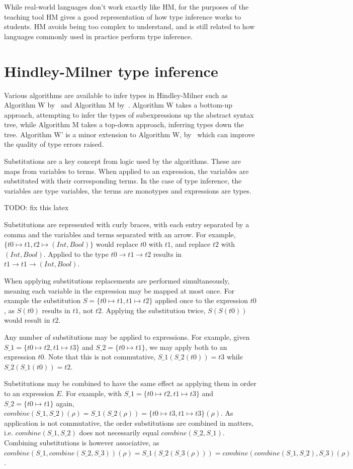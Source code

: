 \documentclass[a4paper,fleqn,twoside,12pt]{report}
\begin{document}
While real-world languages don’t work exactly like HM, for the purposes of the teaching tool HM gives a good representation of how type inference works to students. HM avoids being too complex to understand, and is still related to how languages commonly used in practice perform type inference.
\section{Hindley-Milner type inference}\label{id:h.admfqf7bhkct}
Various algorithms are available to infer types in Hindley-Milner such as Algorithm W by~\cite{ref26} and Algorithm M by~\cite{ref27}. Algorithm W takes a bottom-up approach, attempting to infer the types of subexpressions up the abstract syntax tree, while Algorithm M takes a top-down approach, inferring types down the tree. Algorithm W’ is a minor extension to Algorithm W, by~\cite{ref28} which can improve the quality of type errors raised.

Substitutions are a key concept from logic used by the algorithms. These are maps from variables to terms. When applied to an expression, the variables are substituted with their corresponding terms. In the case of type inference, the variables are type variables, the terms are monotypes and expressions are types.

TODO: fix this latex

Substitutions are represented with curly braces, with each entry separated by a comma and the variables and terms separated with an arrow. For example, $\{ t0 \mapsto t1, t2 \mapsto (Int, Bool) \}$ would replace $t0$ with $t1$, and replace $t2$ with $(Int, Bool)$. Applied to the type $t0 \rightarrow t1 \rightarrow t2$ results in $t1 \rightarrow t1 \rightarrow (Int, Bool)$.

When applying substitutions replacements are performed simultaneously, meaning each variable in the expression may be mapped at most once. For example the substitution $S = \{ t0 \mapsto t1, t1 \mapsto t2 \}$ applied once to the expression $t0$, as $S(t0)$ results in $t1$, not $t2$. Applying the substitution twice, $S(S(t0))$ would result in $t2$.

Any number of substitutions may be applied to expressions. For example, given $S\_1 = \{ t0 \mapsto t2, t1 \mapsto t3 \}$ and $S\_2 = \{ t0 \mapsto t1 \}$, we may apply both to an expression $t0$. Note that this is not commutative, $S\_1(S\_2(t0)) = t3$ while $S\_2(S\_1(t0)) = t2$.

Substitutions may be combined to have the same effect as applying them in order to an expression $E$. For example, with $S\_1 = \{ t0 \mapsto t2, t1 \mapsto t3 \}$ and $S\_2 = \{ t0 \mapsto t1 \}$ again, $combine(S\_1, S\_2)(\rho) = S\_1(S\_2(\rho)) = \{ t0 \mapsto t3, t1 \mapsto t3 \}(\rho)$. As application is not commutative, the order substitutions are combined in matters, i.e. $combine(S\_1, S\_2)$ does not necessarily equal $combine(S\_2, S\_1)$. Combining substitutions is however associative, as $combine(S\_1, combine(S\_2, S\_3))(\rho) = S\_1(S\_2(S\_3(\rho))) = combine(combine(S\_1, S\_2), S\_3)(\rho)$.
\end{document}
